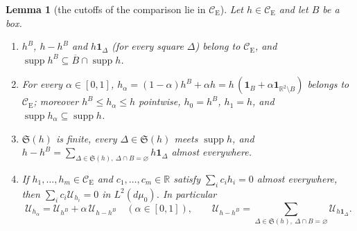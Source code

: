 \documentclass[11pt,a4paper]{article}
\theoremstyle{plain}
\theoremstyle{definition}
\theoremstyle{plain}
\newtheorem{auxlemma}{Lemma}
\theoremstyle{definition}
\newcommand{\R}{\mathbb{R}}
\newcommand{\CE}{\mathcal{C}_{\mathrm E}}
\DeclareMathOperator{\supp}{supp}
\newcommand{\Uc}{\mathcal U}
\newcommand{\dmu}{d\mu_0}
\begin{document}
\begin{auxlemma}[the cutoffs of the comparison lie in $\CE$]\label{aux:notation-cutoffs}
Let $h\in\CE$ and let $B$ be a box.
\begin{enumerate}
\item[\textup{(i)}] $h^B$, $h-h^B$ and $h\mathbf 1_\Delta$ (for every square $\Delta$) belong
to $\CE$, and $\supp h^B\subseteq\overline B\cap\supp h$.
\item[\textup{(ii)}] For every $\alpha\in[0,1]$, $h_\alpha=(1-\alpha)h^B+\alpha h=h\,(\mathbf
1_B+\alpha\mathbf 1_{\R^2\setminus B})$ belongs to $\CE$; moreover $h^B\le h_\alpha\le h$
pointwise, $h_0=h^B$, $h_1=h$, and $\supp h_\alpha\subseteq\supp h$.
\item[\textup{(iii)}] $\mathfrak S(h)$ is finite, every $\Delta\in\mathfrak S(h)$ meets
$\supp h$, and $h-h^B=\sum_{\Delta\in\mathfrak S(h),\ \Delta\cap B=\varnothing}h\mathbf
1_\Delta$ almost everywhere.
\item[\textup{(iv)}] If $h_1,\dots,h_m\in\CE$ and $c_1,\dots,c_m\in\R$ satisfy
$\sum_ic_ih_i=0$ almost everywhere, then $\sum_ic_i\Uc_{h_i}=0$ in $L^2(\dmu)$.  In
particular
\[
 \Uc_{h_\alpha}=\Uc_{h^B}+\alpha\,\Uc_{h-h^B}\quad(\alpha\in[0,1]),\qquad
 \Uc_{h-h^B}=\sum_{\Delta\in\mathfrak S(h),\ \Delta\cap B=\varnothing}\Uc_{h\mathbf 1_\Delta} .
\]
\end{enumerate}
\end{auxlemma}
\end{document}
